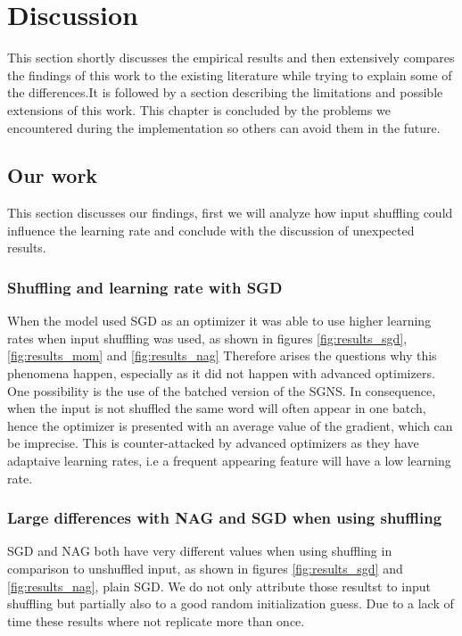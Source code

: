 \chapter{Discussion}\label{chap:discussion}


This section shortly discusses the empirical results and then extensively compares the findings of this work to the existing literature while trying to explain some of the differences.It is followed by a section describing the limitations and possible extensions of this work. This chapter is concluded by the problems we encountered during the implementation so others can avoid them in the future.

\section{Our work}
This section discusses our findings, first we will analyze how input shuffling could influence the learning rate and conclude with the discussion of unexpected results.

\subsection{Shuffling and learning rate with SGD}
When the model used SGD as an optimizer it was able to use higher learning rates when input shuffling was used, as shown in figures \ref{fig:results_sgd}, \ref{fig:results_mom} and \ref{fig:results_nag} Therefore arises the questions why this phenomena happen, especially as it did not happen with advanced optimizers.  One possibility is the use of the batched version of the SGNS. In consequence, when the input is not shuffled the same word will often appear in one batch, hence the optimizer is presented with an average value of the gradient, which can be imprecise. This is counter-attacked by advanced optimizers as they have adaptaive learning rates, i.e a frequent appearing feature will have a low learning rate.  

\subsection{Large differences with NAG and SGD when using shuffling}
SGD and NAG both have very different values when using shuffling in comparison to unshuffled input, as shown in figures \ref{fig:results_sgd} and \ref{fig:results_nag}, plain SGD. We do not only attribute those resultst to input shuffling but partially also to a good random initialization guess. Due to a lack of time these results where not replicate more than once. 

